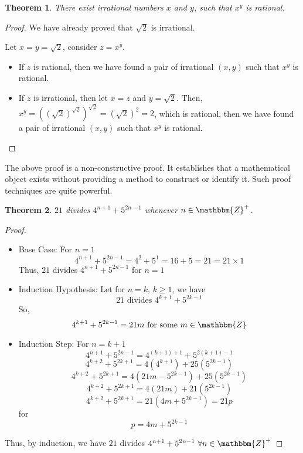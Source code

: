 \documentclass[14pt]{extarticle}
\newcommand{\Z}{\mathbbm{Z}}
\newtheorem{theorem}{Theorem}
\begin{document}
\begin{theorem}
    There exist irrational numbers $x$ and $y$, such that $x^y$ is rational.
\end{theorem}

\begin{proof}
    We have already proved that $\sqrt{2}$ is irrational.

    Let $x = y = \sqrt{2}$, consider $z = x^y$.

    \begin{itemize}
        \item If $z$ is rational, then we have found a pair of irrational $(x, y)$ such that $x^y$ is rational.
        \item If $z$ is irrational, then let $x = z$ and $y = \sqrt2$. Then, $x^y = {({(\sqrt{2})}^{\sqrt{2}})}^{\sqrt{2}} = (\sqrt{2})^2 = 2$, which is rational, then we have found a pair of irrational $(x, y)$ such that $x^y$ is rational.
    \end{itemize}
\end{proof}

The above proof is a non-constructive proof. It establishes that a mathematical object exists without providing a method to construct or identify it. Such proof techniques are quite powerful.

\newpage

\begin{theorem}
    $21$ divides $4^{n+1} + 5^{2n-1}$ whenever $n \in \Z^+$.
\end{theorem}

\begin{proof}
    \begin{itemize}
        \item Base Case: For $n = 1$
        \[ 4^{n+1} + 5^{2n-1} = 4^2 + 5^1 = 16 + 5 = 21 = 21 \times 1 \]
        Thus, $21$ divides $4^{n+1} + 5^{2n-1}$ for $n = 1$
        \item Induction Hypothesis: Let for $n=k$, $k \geq 1$, we have
        \[ 21 \text{ divides } 4^{k+1} + 5^{2k-1} \]
        So,
        \[ 4^{k+1} + 5^{2k-1} = 21m \text{ for some } m \in \Z\]
        \item Induction Step: For $n = k+1$
        \[ 4^{n+1} + 5^{2n-1} = 4^{(k+1)+1} + 5^{2(k+1)-1} \]
        \[ 4^{k+2} + 5^{2k+1} = 4(4^{k+1}) + 25(5^{2k-1})\]
        \[ 4^{k+2} + 5^{2k+1} = 4(21m - 5^{2k-1}) + 25(5^{2k-1})\]
        \[ 4^{k+2} + 5^{2k+1} = 4(21m) + 21(5^{2k-1})\]
        \[ 4^{k+2} + 5^{2k+1} = 21(4m + 5^{2k-1}) = 21p\]
        for \[p = 4m + 5^{2k-1}\]
    \end{itemize}

    Thus, by induction, we have $21$ divides $4^{n+1} + 5^{2n-1} \ \forall n \in \Z^+$
\end{proof}
\end{document}
